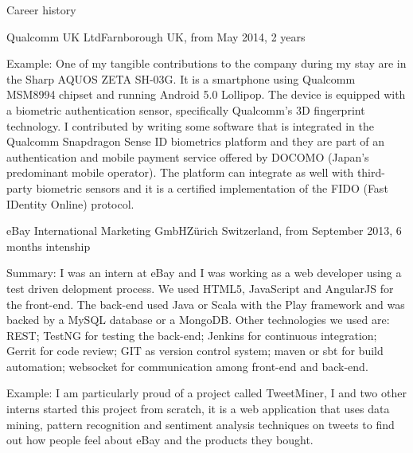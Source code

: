 \documentclass{resume}
\begin{document}
\begin{rSection}{Career history}
\begin{rSubsection}{Qualcomm UK Ltd}{Farnborough UK, from May 2014, 2 years}{}{}
	  
	\item[Example:]
	  One of my tangible contributions to the company during my stay are in the Sharp AQUOS ZETA SH-03G.
	  It is a smartphone using Qualcomm MSM8994 chipset and running Android 5.0 Lollipop. 
	  The device is equipped with a biometric authentication sensor, specifically
	  Qualcomm's 3D fingerprint technology.
	  I contributed by writing some software
	  that is integrated in the Qualcomm Snapdragon Sense ID biometrics platform and they
	  are part of an authentication and mobile payment service offered by DOCOMO (Japan's predominant mobile operator).
	  The platform can integrate as well with third-party biometric sensors and it is a certified
	  implementation of the FIDO (Fast IDentity Online) protocol.
    \end{rSubsection}

    \begin{rSubsection}{eBay International Marketing GmbH}{Z\"urich Switzerland, from September 2013, 6 months intenship}{}{}
	  \item[Summary:]  
	    I was an intern at eBay and I was working as a web developer using a test driven delopment process. 
	    We used HTML5, JavaScript and AngularJS for the front-end. 
	    The back-end used Java or Scala with the Play framework and was backed by a MySQL database or a MongoDB. 
	    Other technologies we used are: 
	        REST;
	    	TestNG for testing the back-end; 
		Jenkins for continuous integration; 
		Gerrit for code review; 
	    	GIT as version control system; 
		maven or sbt for build automation;
		websocket for communication among front-end and back-end.	  
	  \item[Example:]
	    I am particularly proud of a project called TweetMiner, 
	    I and two other interns started this project from scratch,
	    it is a web application that uses data mining, pattern recognition and sentiment analysis techniques on tweets to find out how people feel about eBay and the products they bought. 
    \end{rSubsection}


\end{rSection}
\end{document}
